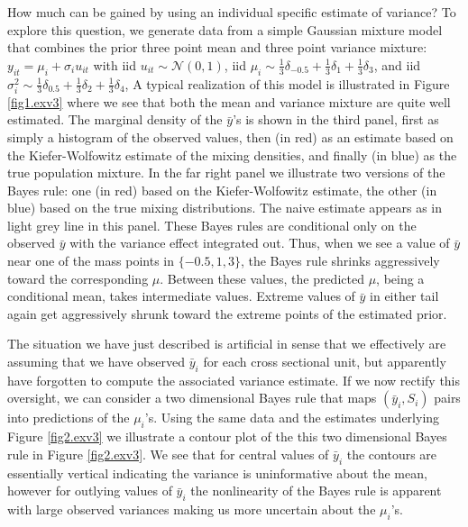 \documentclass[12pt]{amsart}
\def\NN{\mathcal N}
\begin{document}
How much can be gained by using an individual specific estimate of variance?  To explore
this question,  we generate data from a simple Gaussian mixture model that
combines the prior three point mean and three point variance mixture:
$y_{it} = \mu_i + \sigma_i u_{it}$ with iid $u_{it} \sim \NN (0,1)$, 
iid $\mu_i \sim \frac{1}{3} \delta_{-0.5} + \frac{1}{3} \delta_1+ \frac{1}{3} \delta_3$, and  
iid $\sigma_i^2 \sim \frac{1}{3} \delta_{0.5} + \frac{1}{3} \delta_2 + \frac{1}{3} \delta_4$,  
A typical realization of this model is illustrated in Figure \ref{fig1.exv3}
where we see that both the mean and variance mixture are quite well estimated.
The marginal density of the $\bar y$'s is shown in the third panel, first as
simply a histogram of the observed values, then (in red) as an estimate based on the
Kiefer-Wolfowitz estimate of the mixing densities, and finally (in blue) as the
true population mixture.  In the far right panel we illustrate two versions of
the Bayes rule:  one (in red) based on the Kiefer-Wolfowitz estimate, the other
(in blue) based on the true mixing distributions.  The naive estimate appears as in
light grey line in this panel.  These Bayes rules are conditional
only on the observed $\bar y$ with the variance effect integrated out. Thus,
when we see a value of $\bar y$ near one of the mass points in $\{ -0.5, 1, 3\}$, 
the Bayes rule shrinks aggressively toward the corresponding $\mu$.
Between these values, the predicted $\mu$, being a conditional mean, takes 
intermediate values.  Extreme values of $\bar y$ in either tail again get
aggressively  shrunk toward the extreme points  of the estimated prior.

The situation we have just described is artificial in sense that we effectively
are assuming that we have observed $\bar y_i$ for each cross sectional unit,
but apparently have forgotten to compute the associated variance estimate.  If
we now rectify this oversight, we can consider a two dimensional Bayes rule
that maps $(\bar y_i , S_i)$ pairs into predictions of the $\mu_i$'s. Using
the same data and the estimates underlying Figure \ref{fig2.exv3} we illustrate
a contour plot of the this two dimensional Bayes rule in Figure \ref{fig2.exv3}.
We see that for central values of $\bar y_i$ the contours are essentially
vertical indicating the variance is uninformative about the mean, however
for outlying values of $\bar y_i$ the nonlinearity of the Bayes rule is apparent
with large observed variances making us more uncertain about the $\mu_i$'s.
\end{document}

